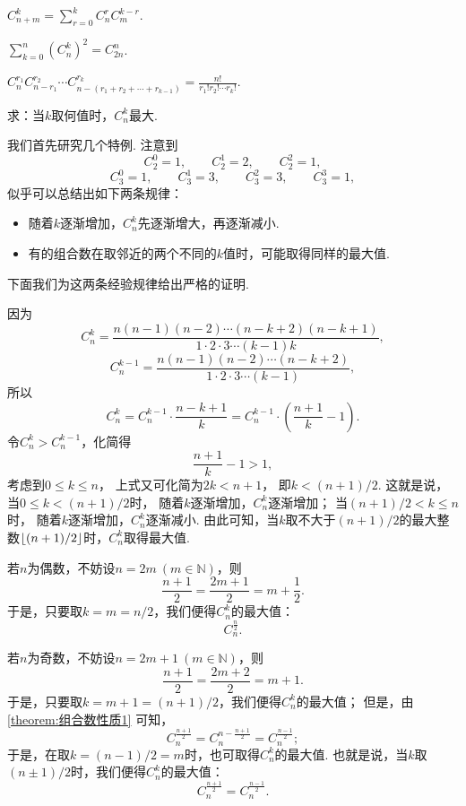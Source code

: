 \begin{property}\label{theorem:组合数性质7}
\(C_{n+m}^k = \sum\limits_{r=0}^{k} C_n^r C_m^{k-r}\).
\end{property}

\begin{property}\label{theorem:组合数性质8}
\(\sum\limits_{k=0}^n (C_n^k)^2 = C_{2n}^n\).
\end{property}

\begin{property}\label{theorem:组合数性质9}
\(C_n^{r_1} C_{n-r_1}^{r_2} \dotsm C_{n-(r_1+r_2+\dotsb+r_{k-1})}^{r_k}
= \frac{n!}{r_1! r_2! \dotsm r_k!}\).
\end{property}

\begin{example}
求：当\(k\)取何值时，\(C_n^k\)最大.
\begin{solution}
我们首先研究几个特例.
注意到\[
	C_2^0 = 1, \qquad
	C_2^1 = 2, \qquad
	C_2^2 = 1,
\]\[
	C_3^0 = 1, \qquad
	C_3^1 = 3, \qquad
	C_3^2 = 3, \qquad
	C_3^3 = 1,
\]
似乎可以总结出如下两条规律：
\begin{itemize}
	\item 随着\(k\)逐渐增加，\(C_n^k\)先逐渐增大，再逐渐减小.
	\item 有的组合数在取邻近的两个不同的\(k\)值时，可能取得同样的最大值.
\end{itemize}
下面我们为这两条经验规律给出严格的证明.

因为\[
	C_n^k = \frac{n(n-1)(n-2)\dotsm(n-k+2)(n-k+1)}{1\cdot2\cdot3\dotsm(k-1)k},
\]\[
	C_n^{k-1} = \frac{n(n-1)(n-2)\dotsm(n-k+2)}{1\cdot2\cdot3\dotsm(k-1)},
\]
所以\[
	C_n^k = C_n^{k-1} \cdot \frac{n-k+1}{k}
	= C_n^{k-1} \cdot \left( \frac{n+1}{k} - 1 \right).
\]
令\(C_n^k > C_n^{k-1}\)，化简得\[
	\frac{n+1}{k} - 1 > 1,
\]
考虑到\(0 \leqslant k \leqslant n\)，
上式又可化简为\(2k < n+1\)，
即\(k < (n+1)/2\).
这就是说，当\(0 \leqslant k < (n+1)/2\)时，
随着\(k\)逐渐增加，\(C_n^k\)逐渐增加；
当\((n+1)/2 < k \leqslant n\)时，
随着\(k\)逐渐增加，\(C_n^k\)逐渐减小.
由此可知，当\(k\)取不大于\((n+1)/2\)的最大整数\(\lfloor(n+1)/2\rfloor\)时，\(C_n^k\)取得最大值.

若\(n\)为偶数，不妨设\(n = 2m\ (m\in\mathbb{N})\)，则\[
	\frac{n+1}{2} = \frac{2m+1}{2}
	= m+\frac{1}{2}.
\]
于是，只要取\(k = m = n/2\)，我们便得\(C_n^k\)的最大值：\[
	C_n^{\frac{n}{2}}.
\]

若\(n\)为奇数，不妨设\(n = 2m+1\ (m\in\mathbb{N})\)，则\[
	\frac{n+1}{2} = \frac{2m+2}{2} = m+1.
\]
于是，只要取\(k = m+1 = (n+1)/2\)，我们便得\(C_n^k\)的最大值；
但是，由\cref{theorem:组合数性质1} 可知，\[
	C_n^{\frac{n+1}{2}}
	= C_n^{n-\frac{n+1}{2}}
	= C_n^{\frac{n-1}{2}};
\]
于是，在取\(k = (n-1)/2 = m\)时，也可取得\(C_n^k\)的最大值.
也就是说，当\(k\)取\((n\pm1)/2\)时，我们便得\(C_n^k\)的最大值：\[
	C_n^{\frac{n+1}{2}}
	= C_n^{\frac{n-1}{2}}.
\]
\end{solution}
\end{example}

